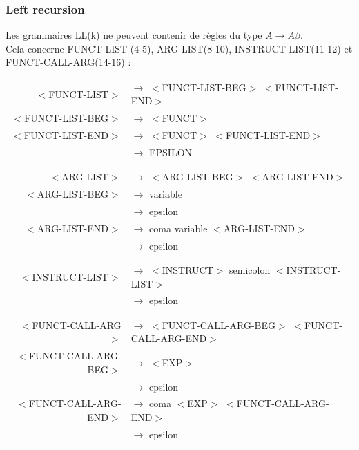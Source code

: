 \documentclass[a4paper,10pt]{article}
\begin{document}
\subsubsection{Left recursion}
	Les grammaires LL(k) ne peuvent contenir de règles du type $A \rightarrow A \beta$.\\
	Cela concerne FUNCT-LIST (4-5), ARG-LIST(8-10), INSTRUCT-LIST(11-12) et FUNCT-CALL-ARG(14-16) : \\

	\begin{center}\begin{tabular}{rl}				
					
		$<$FUNCT-LIST$>$		& $\rightarrow$ $<$FUNCT-LIST-BEG$>$ $<$FUNCT-LIST-END$>$\\
		$<$FUNCT-LIST-BEG$>$	& $\rightarrow$ $<$FUNCT$>$ \\
		$<$FUNCT-LIST-END$>$	& $\rightarrow$ $<$FUNCT$>$ $<$FUNCT-LIST-END$>$\\
								& $\rightarrow$ EPSILON \\
								&\\
								&\\

		$<$ARG-LIST$>$			& $\rightarrow$ $<$ARG-LIST-BEG$>$ $<$ARG-LIST-END$>$\\ 
		$<$ARG-LIST-BEG$>$		& $\rightarrow$ variable\\ 
								& $\rightarrow$ epsilon \\
		$<$ARG-LIST-END$>$		& $\rightarrow$ coma variable $<$ARG-LIST-END$>$\\ 
								& $\rightarrow$ epsilon \\
								&\\
								&\\
		$<$INSTRUCT-LIST$>$		& $\rightarrow$ $<$INSTRUCT$>$ semicolon $<$INSTRUCT-LIST$>$\\
								& $\rightarrow$ epsilon\\
								&\\
								&\\

		$<$FUNCT-CALL-ARG$>$	& $\rightarrow$ $<$FUNCT-CALL-ARG-BEG$>$ $<$FUNCT-CALL-ARG-END$>$\\ 
		$<$FUNCT-CALL-ARG-BEG$>$& $\rightarrow$ $<$EXP$>$\\ 
								& $\rightarrow$ epsilon \\
		$<$FUNCT-CALL-ARG-END$>$& $\rightarrow$ coma $<$EXP$>$ $<$FUNCT-CALL-ARG-END$>$\\ 
								& $\rightarrow$ epsilon \\
	\end{tabular}\end{center}
\end{document}
